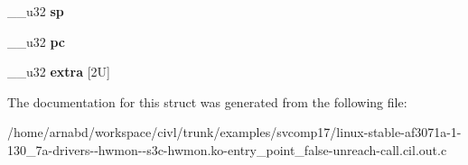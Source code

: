 \begin{DoxyCompactItemize}
\item 
\hypertarget{structcpu__context__save_a8d525f32fc149e005d5745490d6107ee}{}\+\_\+\+\_\+u32 {\bfseries sp}\label{structcpu__context__save_a8d525f32fc149e005d5745490d6107ee}

\item 
\hypertarget{structcpu__context__save_a37322b4a279317ea6739353783d076c7}{}\+\_\+\+\_\+u32 {\bfseries pc}\label{structcpu__context__save_a37322b4a279317ea6739353783d076c7}

\item 
\hypertarget{structcpu__context__save_a05ab7e502d7921e8dab075d71a3cd643}{}\+\_\+\+\_\+u32 {\bfseries extra} \mbox{[}2\+U\mbox{]}\label{structcpu__context__save_a05ab7e502d7921e8dab075d71a3cd643}

\end{DoxyCompactItemize}


The documentation for this struct was generated from the following file\+:\begin{DoxyCompactItemize}
\item 
/home/arnabd/workspace/civl/trunk/examples/svcomp17/linux-\/stable-\/af3071a-\/1-\/130\+\_\+7a-\/drivers-\/-\/hwmon-\/-\/s3c-\/hwmon.\+ko-\/entry\+\_\+point\+\_\+false-\/unreach-\/call.\+cil.\+out.\+c\end{DoxyCompactItemize}
